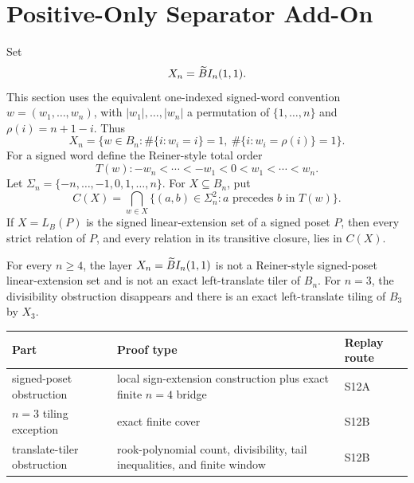 \section{Positive-Only Separator Add-On}\label{sec:separator}

Set
\[
  X_n=\widetilde{B}I_n(1,1).
\]
This section uses the equivalent one-indexed signed-word convention
$w=(w_1,\ldots,w_n)$, with $|w_1|,\ldots,|w_n|$ a permutation of $\{1,\ldots,n\}$ and
$\rho(i)=n+1-i$.  Thus
\[
  X_n=\{w\in B_n:\#\{i:w_i=i\}=1,\ \#\{i:w_i=\rho(i)\}=1\}.
\]
For a signed word define the Reiner-style total order \cite{Reiner1993}
\[
  T(w): -w_n<\cdots<-w_1<0<w_1<\cdots<w_n.
\]
Let $\Sigma_n=\{-n,\ldots,-1,0,1,\ldots,n\}$.  For $X\subseteq B_n$, put
\[
  C(X)=\bigcap_{w\in X}\{(a,b)\in\Sigma_n^2:a\text{ precedes }b\text{ in }T(w)\}.
\]
If $X=L_B(P)$ is the signed linear-extension set of a signed poset $P$, then every strict relation of $P$, and every
relation in its transitive closure, lies in $C(X)$.

\begin{theorem}\label{thm:s12}
For every $n\ge4$, the layer $X_n=\widetilde{B}I_n(1,1)$ is not a Reiner-style signed-poset linear-extension set and is not
an exact left-translate tiler of $B_n$.  For $n=3$, the divisibility obstruction disappears and there is an exact
left-translate tiling of $B_3$ by $X_3$.
\end{theorem}

\begin{center}
\begingroup
\footnotesize
\begin{tabular}{>{\raggedright\arraybackslash}p{}>{\raggedright\arraybackslash}p{}>{\raggedright\arraybackslash}p{}}
\textbf{Part} & \textbf{Proof type} & \textbf{Replay route}\\
\hline
signed-poset obstruction & local sign-extension construction plus exact finite $n=4$ bridge & S12A\\
$n=3$ tiling exception & exact finite cover & S12B\\
translate-tiler obstruction & rook-polynomial count, divisibility, tail inequalities, and finite window & S12B\\
\end{tabular}
\endgroup
\end{center}


